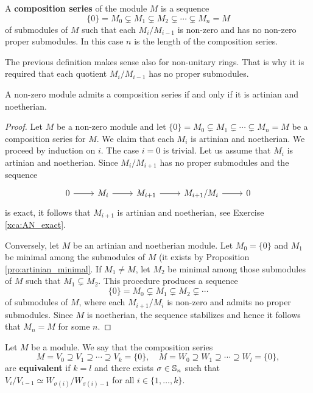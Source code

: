 \begin{definition}
	\label{def:serie_de_composicion}
	A \textbf{composition series} of the module $M$ is a sequence 
	\[
		\{0\}=M_0\subsetneq M_1\subsetneq M_2\subsetneq\cdots\subsetneq M_n=M
	\]
	of submodules of $M$ such that each $M_i/M_{i-1}$ is non-zero and has no non-zero 
	proper submodules. 
	In this case 
	$n$ is the length of the composition series.
\end{definition}

The previous definition makes sense also for non-unitary rings. That is why
it is required that each quotient $M_i/M_{i-1}$ has no proper submodules.

\begin{theorem}
	\label{thm:serie_de_composicion}
	A non-zero module admits a composition series if and only if it is artinian and noetherian.
\end{theorem}

\begin{proof}
	Let $M$ be a non-zero module and let $\{0\}=M_0\subsetneq
	M_1\subsetneq\cdots\subsetneq M_n=M$ be a composition series for $M$.
	We claim that each $M_i$ is artinian and noetherian. We proceed by induction on $i$. The case
	$i=0$ is trivial. Let us assume that $M_i$ is artinian and noetherian. Since 
	$M_i/M_{i+1}$ has no proper submodules and the sequence 
	\[
	\begin{tikzcd}
		0 \arrow{r}
		& M_i \arrow{r}
		& M_{i+1} \arrow{r}
		& M_{i+1}/M_i \arrow{r}
		& 0
	\end{tikzcd}
	\]
	is exact, it follows that 
	$M_{i+1}$ is artinian and noetherian, see Exercise \ref{xca:AN_exact}. 

    Conversely, let $M$ be an artinian and noetherian module. Let $M_0=\{0\}$ and 
    $M_1$ be minimal among the submodules of $M$ (it exists by Proposition \ref{pro:artinian_minimal}.
    If $M_1\ne M$, let 
	$M_2$ be minimal among those submodules of $M$ such that $M_1\subsetneq M_2$. This procedure
	produces a sequence 
	\[
		\{0\}=M_0\subsetneq M_1\subsetneq M_2\subsetneq\cdots
	\]
	of submodules of $M$, where each $M_{i+1}/M_i$ is non-zero and admits no
	proper submodules. Since $M$ is noetherian, the sequence stabilizes and
	hence it follows that $M_n=M$ for some $n$. 
\end{proof}

\begin{definition}
    Let $M$ be a module. 
	We say that the composition series
	\[
	M=V_0\supseteq V_1\supseteq\cdots\supseteq V_k=\{0\},
	\quad
	M=W_0\supseteq W_1\supseteq\cdots\supseteq W_l=\{0\},
	\]
	are \textbf{equivalent} if $k=l$ and there exists 
	$\sigma\in\mathbb{S}_n$ such that 
	$V_{i}/V_{i-1}\simeq W_{\sigma(i)}/W_{\sigma(i)-1}$
	for all $i\in\{1,\dots,k\}$.
\end{definition}

